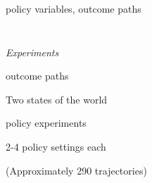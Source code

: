 \documentclass[]{beamer} %
\begin{document}
\begin{frame}{ policy variables,  outcome paths}
\begin{columns}
\begin{column}{0.5\textwidth}
{    %
    }
    \end{column}
\end{columns}
\vspace{.3cm}
\end{frame}%

\begin{frame}{}
  \centering \Huge
  
  \emph{Experiments}
  
\vspace{.5cm}
 \Large 
 outcome paths 

Two states of the world 

 \vspace{.5cm}
 \Large  policy experiments 
 
 2-4 policy settings  each 

 \vspace{.5cm}
 
\small
(Approximately 290 trajectories)
\end{frame}
\end{document}
